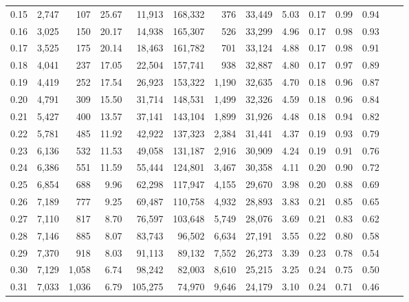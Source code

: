 \begin{tabular}{rrrrrrrrrrrrrr}
0.15 &  2,747 &    107 &   25.67 &   11,913 &  168,332 &     376 &  33,449 &  5.03 &  0.17 &  0.99 &      0.94 \\
0.16 &  3,025 &    150 &   20.17 &   14,938 &  165,307 &     526 &  33,299 &  4.96 &  0.17 &  0.98 &      0.93 \\
0.17 &  3,525 &    175 &   20.14 &   18,463 &  161,782 &     701 &  33,124 &  4.88 &  0.17 &  0.98 &      0.91 \\
0.18 &  4,041 &    237 &   17.05 &   22,504 &  157,741 &     938 &  32,887 &  4.80 &  0.17 &  0.97 &      0.89 \\
0.19 &  4,419 &    252 &   17.54 &   26,923 &  153,322 &   1,190 &  32,635 &  4.70 &  0.18 &  0.96 &      0.87 \\
0.20 &  4,791 &    309 &   15.50 &   31,714 &  148,531 &   1,499 &  32,326 &  4.59 &  0.18 &  0.96 &      0.84 \\
0.21 &  5,427 &    400 &   13.57 &   37,141 &  143,104 &   1,899 &  31,926 &  4.48 &  0.18 &  0.94 &      0.82 \\
0.22 &  5,781 &    485 &   11.92 &   42,922 &  137,323 &   2,384 &  31,441 &  4.37 &  0.19 &  0.93 &      0.79 \\
0.23 &  6,136 &    532 &   11.53 &   49,058 &  131,187 &   2,916 &  30,909 &  4.24 &  0.19 &  0.91 &      0.76 \\
0.24 &  6,386 &    551 &   11.59 &   55,444 &  124,801 &   3,467 &  30,358 &  4.11 &  0.20 &  0.90 &      0.72 \\
0.25 &  6,854 &    688 &    9.96 &   62,298 &  117,947 &   4,155 &  29,670 &  3.98 &  0.20 &  0.88 &      0.69 \\
0.26 &  7,189 &    777 &    9.25 &   69,487 &  110,758 &   4,932 &  28,893 &  3.83 &  0.21 &  0.85 &      0.65 \\
0.27 &  7,110 &    817 &    8.70 &   76,597 &  103,648 &   5,749 &  28,076 &  3.69 &  0.21 &  0.83 &      0.62 \\
0.28 &  7,146 &    885 &    8.07 &   83,743 &   96,502 &   6,634 &  27,191 &  3.55 &  0.22 &  0.80 &      0.58 \\
0.29 &  7,370 &    918 &    8.03 &   91,113 &   89,132 &   7,552 &  26,273 &  3.39 &  0.23 &  0.78 &      0.54 \\
0.30 &  7,129 &  1,058 &    6.74 &   98,242 &   82,003 &   8,610 &  25,215 &  3.25 &  0.24 &  0.75 &      0.50 \\
0.31 &  7,033 &  1,036 &    6.79 &  105,275 &   74,970 &   9,646 &  24,179 &  3.10 &  0.24 &  0.71 &      0.46 \\

\end{tabular}
